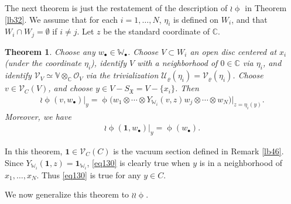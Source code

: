 \documentclass[12pt,b5paper,notitlepage]{report}
\theoremstyle{definition}
\theoremstyle{plain}
\newtheorem{thm}[df]{Theorem}
\newcommand{\fk}{\mathfrak}
\newcommand{\mc}{\mathcal}
\newcommand{\id}{\mathbf{1}}
\newcommand{\scr}{\mathscr}
\newcommand{\blt}{\bullet}
\newcommand{\Vbb}{\mathbb V}
\newcommand{\Wbb}{\mathbb W}
\newcommand{\Cbb}{\mathbb C}
\numberwithin{equation}{section}
\begin{document}
The next theorem is just the restatement of the description of $\wr\upphi$ in Theorem \ref{lb32}. We assume that for each $i=1,\dots,N$, $\eta_i$ is defined on $W_i$, and that $W_i\cap W_j=\emptyset$ if $i\neq j$. Let $z$ be the standard coordinate of $\Cbb$.
\begin{thm}\label{lb47}
Choose any  $w_\blt\in\Wbb_\blt$.  Choose $V\subset W_i$ an open disc centered at $x_i$ (under the coordinate $\eta_i$), identify $V$ with a neighborhood of $0\in\Cbb$ via $\eta_i$, and identify $\scr V_V\simeq \Vbb\otimes_\Cbb\scr O_V$ via the trivialization $\mc U_\varrho(\eta_i)=\mc V_\varrho(\eta_i)$. Choose $v\in\scr V_C(V)$, and choose  $y\in V-S_{\fk X}=V-\{x_i\}$. Then
\begin{align}
\wr\upphi(v,w_\blt)\big|_y=\upphi\big(w_1\otimes\cdots\otimes Y_{\Wbb_i}(v,z)w_j\otimes\cdots\otimes w_N\big)\big|_{z=\eta_i(y)}.
\end{align}
Moreover, we have
\begin{align}
\wr\upphi(\id,w_\blt)|_y=\upphi(w_\blt).\label{eq130}
\end{align}
\end{thm}

In this theorem, $\id\in \scr V_C(C)$ is the vacuum section defined in Remark \ref{lb46}. Since $Y_{\Wbb_i}(\id,z)=\id_{\Wbb_i}$, \eqref{eq130} is clearly true when $y$ is in a neighborhood of $x_1,\dots,x_N$. Thus \eqref{eq130} is true for any $y\in C$.


We now generalize this theorem to $\wr\wr\upphi$. 
\end{document}
